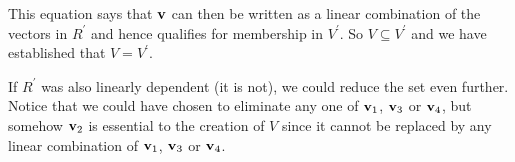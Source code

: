 \documentclass{ximera}
\begin{document}
\begin{example}
  This equation says that $\mathbf{v}$ can then be written as a linear
  combination of the vectors in $R^\prime$ and hence qualifies for
  membership in $V^\prime$.  So $V\subseteq V^\prime$ and we have
  established that $V=V^\prime$.

  If $R^\prime$ was also linearly dependent (it is not), we could
  reduce the set even further.  Notice that we could have chosen to
  eliminate any one of $\mathbf{v}_1$, $\mathbf{v}_3$ or $\mathbf{v}_4$, but
  somehow $\mathbf{v}_2$ is essential to the creation of $V$ since it
  cannot be replaced by any linear combination of $\mathbf{v}_1$,
  $\mathbf{v}_3$ or $\mathbf{v}_4$.

\end{example}
\end{document}
